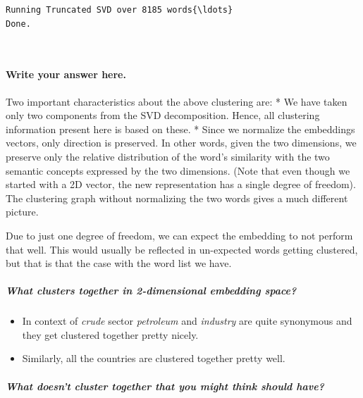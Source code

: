 \documentclass[11pt]{article}
\providecommand{\tightlist}{%
      \setlength{\itemsep}{0pt}\setlength{\parskip}{0pt}}
\begin{document}
    \begin{Verbatim}[commandchars=\\\{\},fontsize=\footnotesize]
Running Truncated SVD over 8185 words{\ldots}
Done.

    \end{Verbatim}

    \begin{center}
    \end{center}
    { \hspace*{\fill} \\}
    
    \paragraph{Write your answer here.}\label{write-your-answer-here.}

    Two important characteristics about the above clustering are: * We have
taken only two components from the SVD decomposition. Hence, all
clustering information present here is based on these. * Since we
normalize the embeddings vectors, only direction is preserved. In other
words, given the two dimensions, we preserve only the relative
distribution of the word's similarity with the two semantic concepts
expressed by the two dimensions. (Note that even though we started with
a 2D vector, the new representation has a single degree of freedom). The
clustering graph without normalizing the two words gives a much
different picture.

Due to just one degree of freedom, we can expect the embedding to not
perform that well. This would usually be reflected in un-expected words
getting clustered, but that is that the case with the word list we have.

\subparagraph{What clusters together in 2-dimensional embedding
space?}\label{what-clusters-together-in-2-dimensional-embedding-space}

\begin{itemize}
\tightlist
\item
  In context of \emph{crude} sector \emph{petroleum} and \emph{industry}
  are quite synonymous and they get clustered together pretty nicely.
\item
  Similarly, all the countries are clustered together pretty well.
\end{itemize}

\subparagraph{What doesn't cluster together that you might think should
have?}\label{what-doesnt-cluster-together-that-you-might-think-should-have}
\end{document}
